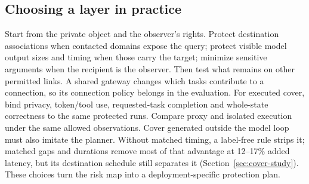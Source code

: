 \subsection{Choosing a layer in practice}
Start from the private object and the observer's rights. Protect destination associations when contacted domains expose the query; protect visible model output sizes and timing when those carry the target; minimize sensitive arguments when the recipient is the observer. Then test what remains on other permitted links. A shared gateway changes which tasks contribute to a connection, so its connection policy belongs in the evaluation. For executed cover, bind privacy, token/tool use, requested-task completion and whole-state correctness to the same protected runs. Compare proxy and isolated execution under the same allowed observations. Cover generated outside the model loop must also imitate the planner. Without matched timing, a label-free rule strips it; matched gaps and durations remove most of that advantage at 12--17\% added latency, but its destination schedule still separates it (Section~\ref{sec:cover-study}). These choices turn the risk map into a deployment-specific protection plan.
